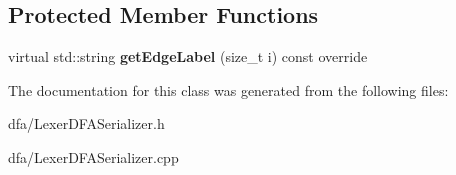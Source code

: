 \subsection*{Protected Member Functions}
\begin{DoxyCompactItemize}
\item 
\mbox{\label{classantlr4_1_1dfa_1_1LexerDFASerializer_af3464020079343b41c28c6eeb48a48ab}} 
virtual std\+::string {\bfseries get\+Edge\+Label} (size\+\_\+t i) const override
\end{DoxyCompactItemize}


The documentation for this class was generated from the following files\+:\begin{DoxyCompactItemize}
\item 
dfa/Lexer\+D\+F\+A\+Serializer.\+h\item 
dfa/Lexer\+D\+F\+A\+Serializer.\+cpp\end{DoxyCompactItemize}
